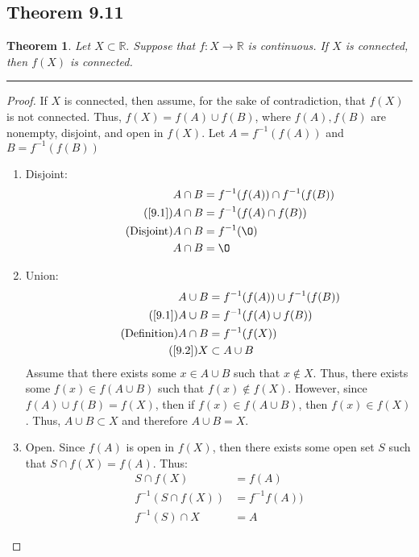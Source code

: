 \documentclass[openany, amssymb, psamsfonts]{amsart}
\newcommand{\bbR}{\mathbb{R}}
\renewcommand{\emptyset}{\O}
\newcommand{\arr}{\longrightarrow}
\newtheorem{thm}{Theorem}[section]
\theoremstyle{definition}
\numberwithin{equation}{section}
\begin{document}
\subsection*{Theorem 9.11}
\begin{thm}
\label{9.11}
Let $X\subset \bbR.$ Suppose that $f \colon X \arr \bbR$ is continuous.  If $X$ is connected, then $f(X)$ is connected.
\end{thm}
\vspace{4pt}     \hrule   \vspace{4pt} \begin{proof}
If $X$ is connected, then assume, for the sake of contradiction, that $f(X)$ is not connected. Thus, $f(X) = f(A)\cup f(B)$, where $f(A),f(B)$ are nonempty, disjoint, and open in $f(X)$. Let $A = f^{-1}(f(A))$ and $B = f^{-1}(f(B))$
\begin{enumerate}
    \item Disjoint:
    \begin{align*}
        A\cap B &= f^{-1}(f(A)) \cap f^{-1}(f(B))\\
        \tag{\ref{9.1}} A\cap B &= f^{-1}(f(A) \cap f(B))\\
        \tag{Disjoint} A\cap B &= f^{-1}(\emptyset)\\
        A\cap B &= \emptyset
    \end{align*}
        \item Union:
    \begin{align*}
        A\cup B &= f^{-1}(f(A)) \cup f^{-1}(f(B))\\
        \tag{\ref{9.1}} A\cup B &= f^{-1}(f(A) \cup f(B))\\
        \tag{Definition} A\cap B &= f^{-1}(f(X))\\
        \tag{\ref{9.2}} X &\subset A\cup B\\
    \end{align*}
    Assume that there exists some $x\in A\cup B$ such that $x\notin X$. Thus, there exists some $f(x) \in f(A\cup B)$ such that $f(x) \notin f(X)$. However, since $f(A) \cup f(B) = f(X)$, then if $f(x) \in f(A\cup B)$, then $f(x) \in f(X)$. Thus, $A\cup B \subset X$ and therefore $A\cup B = X$.
    \item Open. Since $f(A)$ is open in $f(X)$, then there exists some open set $S$ such that $S\cap f(X) = f(A)$. Thus:
    \begin{align*}
        S\cap f(X) &= f(A)\\
        f^{-1}(S\cap f(X)) &= f^{-1}f(A))\\
        f^{-1}(S) \cap X &= A

\end{align*}
\end{enumerate}
\end{proof}
\end{document}
